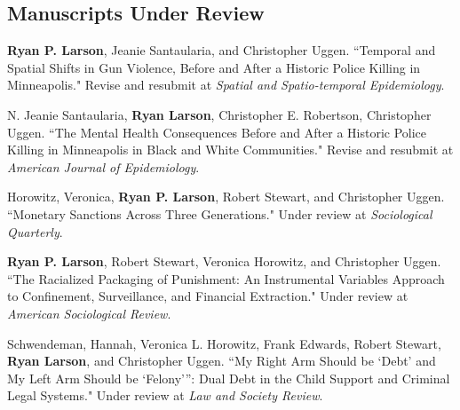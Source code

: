\documentclass[letterpaper]{article}
\renewenvironment{itemize}{
  \begin{list}{}{
    \setlength{\leftmargin}{1.5em}
  }
}{
  \end{list}
}
\begin{document}
\subsection*{Manuscripts Under Review}
\begin{itemize}

\item \textbf{Ryan P. Larson}, Jeanie Santaularia,  and Christopher Uggen. ``Temporal and Spatial Shifts in Gun Violence, Before and After a Historic Police Killing in Minneapolis." Revise and resubmit at \textit{Spatial and Spatio-temporal Epidemiology}.

\item N. Jeanie Santaularia, \textbf{Ryan Larson}, Christopher E. Robertson, Christopher Uggen. ``The Mental Health Consequences Before and After a Historic Police Killing in Minneapolis in Black and White Communities." Revise and resubmit at \textit{American Journal of Epidemiology}. 

\item Horowitz, Veronica, \textbf{Ryan P. Larson}, Robert Stewart, and Christopher Uggen. ``Monetary Sanctions Across Three Generations." Under review at \textit{Sociological Quarterly}.

\item \textbf{Ryan P. Larson}, Robert Stewart, Veronica Horowitz, and Christopher Uggen. ``The Racialized Packaging of Punishment: An Instrumental Variables Approach to Confinement, Surveillance, and Financial Extraction." Under review at \textit{American Sociological Review}.

\item Schwendeman, Hannah, Veronica L. Horowitz, Frank Edwards, Robert Stewart,  \textbf{Ryan Larson}, and Christopher Uggen. ``My Right Arm Should be ‘Debt’ and My Left Arm Should be ‘Felony’”: Dual Debt in the Child Support and Criminal Legal Systems." Under review at \textit{Law and Society Review}. 


\end{itemize}
\end{document}
